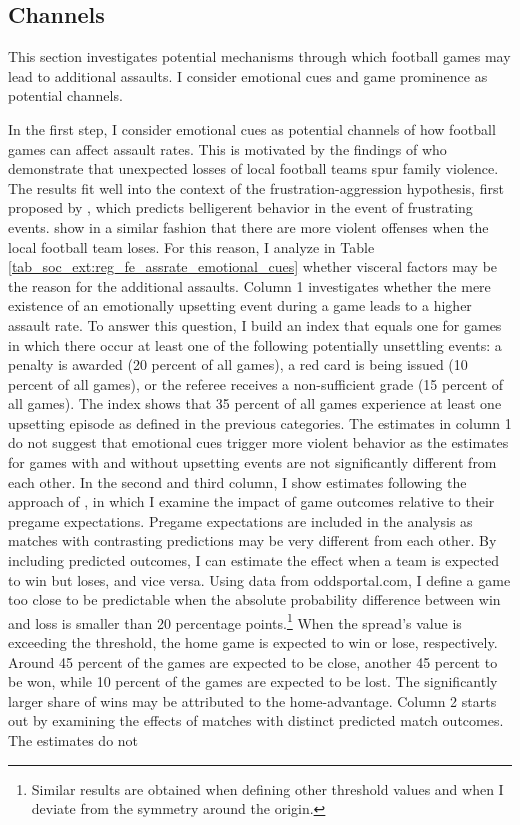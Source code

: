 \subsection{Channels}
This section investigates potential mechanisms through which football games may lead to additional assaults. I consider emotional cues and game prominence as potential channels.



In the first step, I consider emotional cues as potential channels of how football games can affect assault rates. This is motivated by the findings of \cite{card2011family} who demonstrate that unexpected losses of local football teams spur family violence. The results fit well into the context of the frustration-aggression hypothesis, first proposed by \cite{dollard1939frustration}, which predicts belligerent behavior in the event of frustrating events. \cite{rees2009college} show in a similar fashion that there are more violent offenses when the local football team loses. For this reason, I analyze in Table \ref{tab_soc_ext:reg_fe_assrate_emotional_cues} whether visceral factors may be the reason for the additional assaults. Column 1 investigates whether the mere existence of an emotionally upsetting event during a game leads to a higher assault rate. To answer this question, I build an index that equals one for games in which there occur at least one of the following potentially unsettling events: a penalty is awarded (20 percent of all games), a red card is being issued (10 percent of all games), or the referee receives a non-sufficient grade (15 percent of all games). The index shows that 35 percent of all games experience at least one upsetting episode as defined in the previous categories. The estimates in column 1 do not suggest that emotional cues trigger more violent behavior as the estimates for games with and without upsetting events are not significantly different from each other. 	In the second and third column, I show estimates following the approach of \cite{card2011family}, in which I examine the impact of game outcomes relative to their pregame expectations. Pregame expectations are included in the analysis as matches with contrasting predictions may be very different from each other. By including predicted outcomes, I can estimate the effect when a team is expected to win but loses, and vice versa. Using data from oddsportal.com, I define a game too close to be predictable when the absolute probability difference between win and loss is smaller than 20 percentage points.\footnote{Similar results are obtained when defining other threshold values and when I deviate from the symmetry around the origin.} When the spread's value is exceeding the threshold, the home game is expected to win or lose, respectively. Around 45 percent of the games are expected to be close, another 45 percent to be won, while 10 percent of the games are expected to be lost. The significantly larger share of wins may be attributed to the home-advantage. Column 2 starts out by examining the effects of matches with distinct predicted match outcomes. The estimates do not 